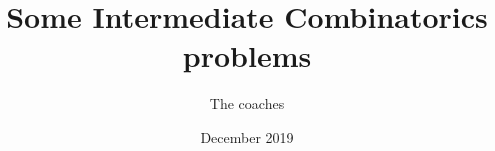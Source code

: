 \documentclass[a4paper,12pt]{article}
\begin{document}
\title {Some Intermediate Combinatorics problems}
\author{The coaches}
\date{December 2019}
\maketitle

\begin{itemize}

\end{itemize}
\end{document}
